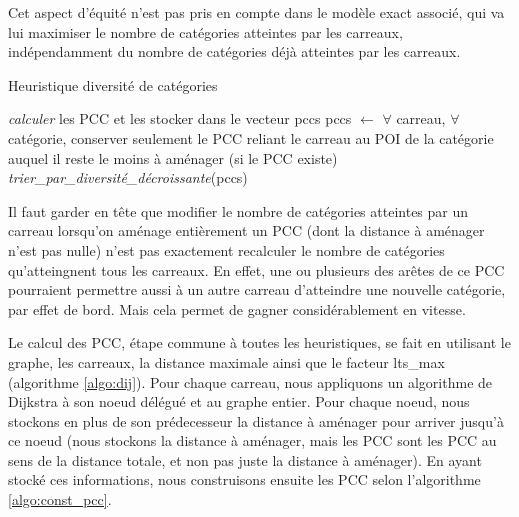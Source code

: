 Cet aspect d'équité n'est pas pris en compte dans le modèle exact associé, qui va lui maximiser le nombre de catégories atteintes par les carreaux, indépendamment du nombre de catégories déjà atteintes par les carreaux.

\begin{algorithm}[!ht]
\DontPrintSemicolon
\caption{Heuristique diversité de catégories}
\label{hpccdiv}
\emph{calculer} les PCC et les stocker dans le vecteur pccs\;
pccs $\leftarrow$ $\forall$ carreau, $\forall$ catégorie, conserver seulement le PCC reliant le carreau au POI de la catégorie auquel il reste le moins à aménager (si le PCC existe)\;
\emph{trier\_par\_diversité\_décroissante}(pccs)  %
\end{algorithm}

Il faut garder en tête que modifier le nombre de catégories atteintes par un carreau lorsqu'on aménage entièrement un PCC (dont la distance à aménager n'est pas nulle) n'est pas exactement recalculer le nombre de catégories qu'atteingnent tous les carreaux. En effet, une ou plusieurs des arêtes de ce PCC pourraient permettre aussi à un autre carreau d'atteindre une nouvelle catégorie, par effet de bord. Mais cela permet de gagner considérablement en vitesse.

Le calcul des PCC, étape commune à toutes les heuristiques, se fait en utilisant le graphe, les carreaux, la distance maximale ainsi que le facteur lts\_max (algorithme \ref{algo:dij}). Pour chaque carreau, nous appliquons un algorithme de Dijkstra à son noeud délégué et au graphe entier. Pour chaque noeud, nous stockons en plus de son prédecesseur la distance à aménager pour arriver jusqu'à ce noeud (nous stockons la distance à aménager, mais les PCC sont les PCC au sens de la distance totale, et non pas juste la distance à aménager). En ayant stocké ces informations, nous construisons ensuite les PCC selon l'algorithme \ref{algo:const_pcc}.

